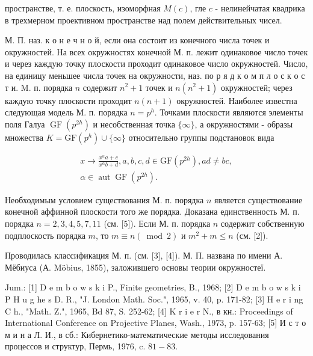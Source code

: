 \documentclass[10pt]{article}
\begin{document}
пространстве, т. е. плоскость, изоморфная $M(c)$, гле $c$ - нелинейчатая квадрика в трехмерном проективном пространстве над полем действительных чисел.



М. П. наз. к о н е ч н о й, если она состоит из конечного числа точек и окружностей. На всех окружностях конечной М. п. лежит одинаковое число точек и через каждую точку плоскости проходит одинаковое число окружностей. Число, на единицу меньшее числа точек на окружности, наз. по р я д к о м п л о с к о с т и. M. п. порядка $n$ содержит $n^{2}+1$ точек и $n\left(n^{2}+1\right)$ окружностей; через каждую точку плоскости проходит $n(n+1)$ окружностей. Наиболее известна следующая модель М. п. порядка $n=p^{h}$. Точками плоскости являются элементы поля Галуа $\operatorname{GF}\left(p^{2 h}\right)$ и несобственная точка $\{\infty\}$, а окружностями - образы множества $K=\mathrm{GF}\left(p^{h}\right) \cup\{\infty\}$ относительно группы подстановок вида



\[

\begin{gathered}

x \longrightarrow \frac{x^{\alpha} a+c}{x^{\alpha} b+d}, a, b, c, d \in \mathrm{GF}\left(p^{2 h}\right), a d \neq b c, \\

\alpha \in \operatorname{aut} \operatorname{GF}\left(p^{2 h}\right) .

\end{gathered}

\]



Необходимым условием существования М. п. порядка $n$ является существование конечной аффинной плоскости того же порядка. Доказана единственность М. п. порядка $n=2,3,4,5,7,11$ (см. [5]). Если М. п. порядка $n$ содержит собственную подплоскость порядка $m$, то $m \equiv n(\bmod 2)$ и $m^{2}+m \leqslant n$ (см. [2]).



Проводилась классификация М. п. (см. [3], [4]). М. П. названа по имени А. Мёбиуса (А. Möbius, 1855), заложившего основы теории окружностеї.



Jum.: [1] D e m b o w s k i P., Finite geometries, B., 1968; [2] D e m b o w s k i P H u g he s D. R., "J. London Math. Soc.", 1965, v. 40, p. 171-82; [3] H e r i ng C h., "Math. Z.", 1965, Bd 87, S. 252-62; [4] K r i e r N., в кн.: Proceedings of International Conference on Projective Planes, Wash., 1973, p. 157-63; [5] И с т о м и н а Л. И., в сб.: Кибернетико-математические методы исследования процессов и структур, Пермь, 1976, c. $81-83$.
\end{document}
